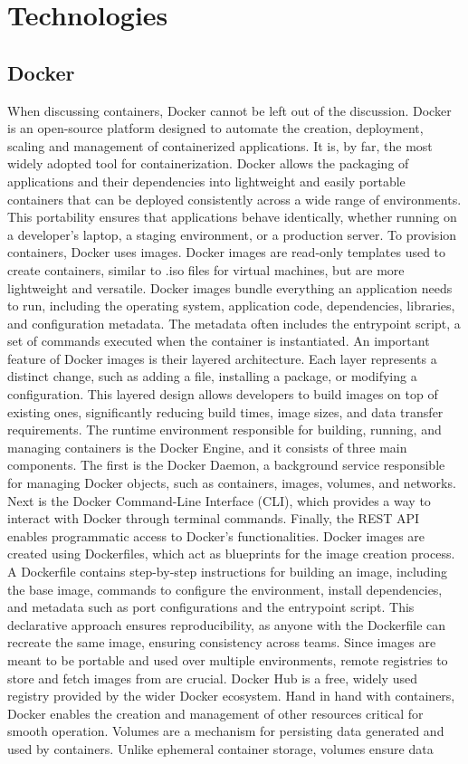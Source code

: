 \chapter{Technologies} \label{ch:technologies}

\section{Docker}
When discussing containers, Docker cannot be left out of the discussion. Docker is an open-source platform designed to automate the creation, deployment, scaling and management of containerized applications. It is, by far, the most widely adopted tool for containerization. Docker allows the packaging of applications and their dependencies into lightweight and easily portable containers that can be deployed consistently across a wide range of environments. This portability ensures that applications behave identically, whether running on a developer's laptop, a staging environment, or a production server. To provision containers, Docker uses images. Docker images are read-only templates used to create containers, similar to .iso files for virtual machines, but are more lightweight and versatile. Docker images bundle everything an application needs to run, including the operating system, application code, dependencies, libraries, and configuration metadata. The metadata often includes the entrypoint script, a set of commands executed when the container is instantiated. An important feature of Docker images is their layered architecture. Each layer represents a distinct change, such as adding a file, installing a package, or modifying a configuration. This layered design allows developers to build images on top of existing ones, significantly reducing build times, image sizes, and data transfer requirements. The runtime environment responsible for building, running, and managing containers is the Docker Engine, and it consists of three main components. The first is the Docker Daemon, a background service responsible for managing Docker objects, such as containers, images, volumes, and networks. Next is the Docker Command-Line Interface (CLI), which provides a way to interact with Docker through terminal commands. Finally, the REST API enables programmatic access to Docker's functionalities. Docker images are created using Dockerfiles, which act as blueprints for the image creation process. A Dockerfile contains step-by-step instructions for building an image, including the base image, commands to configure the environment, install dependencies, and metadata such as port configurations and  the entrypoint script. This declarative approach ensures reproducibility, as anyone with the Dockerfile can recreate the same image, ensuring consistency across teams. Since images are meant to be portable and used over multiple environments, remote registries to store and fetch images from are crucial. Docker Hub is a free, widely used registry provided by the wider Docker ecosystem. Hand in hand with containers, Docker enables the creation and management of other resources critical for smooth operation. Volumes are a mechanism for persisting data generated and used by containers. Unlike ephemeral container storage, volumes ensure data 